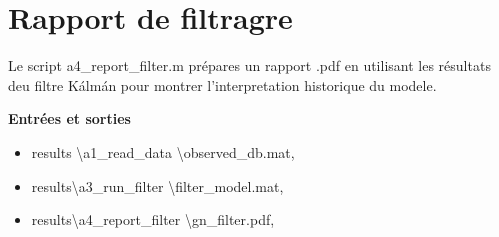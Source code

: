  \section{Rapport de filtragre}
    Le script {\color{magenta}a4\_report\_filter.m} prépares un rapport .pdf en utilisant les résultats deu filtre Kálmán pour montrer l'interpretation historique du modele.

    {\bf Entrées et sorties}
    \begin{itemize}
        \item[\textrightarrow] {\color{magenta} results \textbackslash a1\_read\_data \textbackslash observed\_db.mat},
        \item[\textleftarrow] {\color{magenta}results\textbackslash a3\_run\_filter \textbackslash filter\_model.mat},
        \item[\textleftarrow] {\color{magenta}results\textbackslash a4\_report\_filter \textbackslash gn\_filter.pdf},
    \end{itemize}
